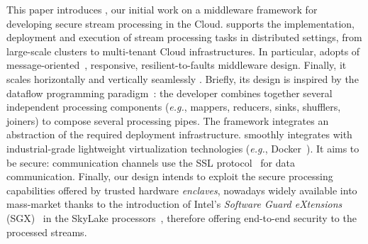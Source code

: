 This paper introduces \SYS{}, our initial work on a middleware framework for developing secure stream processing in the Cloud.
\SYS{} supports the implementation, deployment and execution of stream processing tasks in distributed settings, from large-scale clusters to multi-tenant Cloud infrastructures.
In particular, \SYS{} adopts of message-oriented~\cite{mom}, responsive, resilient-to-faults middleware design.
Finally, it scales horizontally and vertically seamlessly  .
Briefly, its design is inspired by the dataflow programming paradigm~\cite{uustalu_essence_2005}: the developer combines together several independent processing components (\emph{e.g.}, mappers, reducers, sinks, shufflers, joiners) to compose several processing pipes.
The framework integrates an abstraction of the required deployment infrastructure.
\SYS{} smoothly integrates with industrial-grade lightweight virtualization technologies (\emph{e.g.}, Docker~\cite{docker}).
It aims to be secure: communication channels use the SSL protocol~\cite{freier2011secure} for data communication.
Finally, our design intends to exploit the secure processing capabilities offered by trusted hardware \emph{enclaves}, nowadays widely available into mass-market thanks to the introduction of Intel's \emph{Software Guard eXtensions} (SGX)~\cite{costan_intel} in the SkyLake processors~\cite{intel:skylake}, therefore offering end-to-end security to the processed streams.

